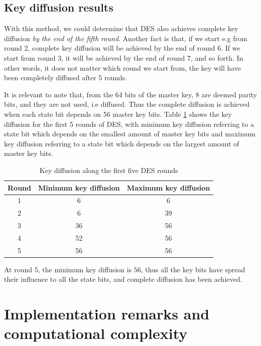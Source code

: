 \documentclass{report}
\begin{document}
\subsection{Key diffusion results}
With this method, we could determine that DES also achieves complete key diffusion \emph{by the end of the fifth round}. Another fact is that, if we start e.g from round 2, complete key diffusion will be achieved by the end of round 6. If we start from round 3, it will be achieved by the end of round 7, and so forth. In other words, it does not matter which round we start from, the key will have been completely diffused after 5 rounds.

It is relevant to note that, from the 64 bits of the master key, 8 are deemed parity bits, and they are not used, i.e diffused. Thus the complete diffusion is achieved when each state bit depends on 56 master key bits. Table \ref{tab:key-dif-des} shows the key diffusion for the first 5 rounds of DES, with minimum key diffusion referring to a state bit which depends on the smallest amount of master key bits and maximum key diffusion referring to a state bit which depends on the largest amount of master key bits.

\begin{table}[H]
\centering
\begin{tabular}{|c|c|c|}
\hline
\textbf{Round} & \textbf{Minimum key diffusion} & \textbf{Maximum key diffusion} \\ \hline
1              & 6                              & 6                              \\ \hline
2              & 6                              & 39                             \\ \hline
3              & 36                             & 56                             \\ \hline
4              & 52                             & 56                             \\ \hline
5              & 56                             & 56                             \\ \hline
\end{tabular}
\caption{Key diffusion along the first five DES rounds}
\label{tab:key-dif-des}
\end{table}

At round $5$, the minimum key diffusion is $56$, thus all the key bits have spread their influence to all the state bits, and complete diffusion has been achieved.

\section{Implementation remarks and computational complexity}\label{sec:complexity}
\end{document}
